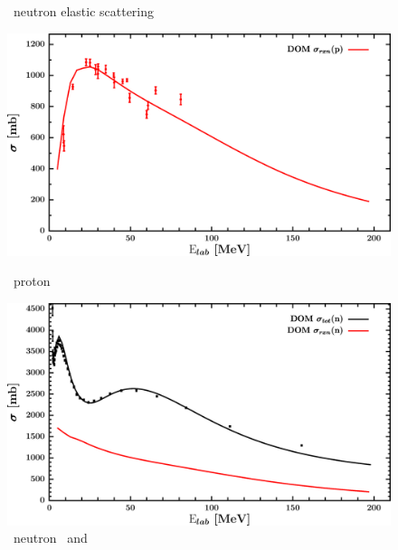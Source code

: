 \begin{figure}[hbtp]
\begin{minipage}{0.47\textwidth}
        \caption*{\niEight\ neutron elastic scattering}
        \label{DOMFitData_ni58_neutron_elastic}
    \end{minipage}
\end{figure}
\vspace{0.70in}
\begin{figure}[hbtp]
    \centering
    \begin{minipage}{0.47\textwidth}
        \centering
        \includegraphics[width=\linewidth]{figures/ni58_protonInelastic.png}
        \caption*{\niEight\ proton \rxn}
        \label{DOMFitData_ni58_proton_inelastic}
    \end{minipage}\hspace{6pt}
    \begin{minipage}{0.47\textwidth}
        \centering
        \includegraphics[width=\textwidth]{figures/ni58_neutronInelastic.png}
        \caption*{\niEight\ neutron \rxn\ and \tot}
        \label{DOMFitData_ni58_neutron_inelastic}
    \end{minipage}
\end{figure}
